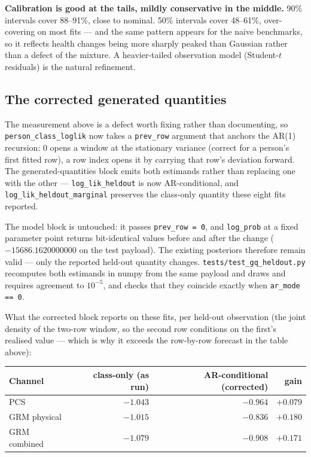 \documentclass[11pt]{article}
\newcommand{\code}[1]{\texttt{\small #1}}
\begin{document}
\textbf{Calibration is good at the tails, mildly conservative in the
middle.} 90\% intervals cover 88--91\%, close to nominal. 50\% intervals
cover 48--61\%, over-covering on most fits --- and the same pattern appears
for the naive benchmarks, so it reflects health changes being more sharply
peaked than Gaussian rather than a defect of the mixture. A heavier-tailed
observation model (Student-$t$ residuals) is the natural refinement.

\subsection*{The corrected generated quantities}
\label{sec:gqfix}

The measurement above is a defect worth fixing rather than documenting, so
\code{person\_class\_loglik} now takes a \code{prev\_row} argument that
anchors the AR(1) recursion: $0$ opens a window at the stationary variance
(correct for a person's first fitted row), a row index opens it by carrying
that row's deviation forward. The generated-quantities block emits both
estimands rather than replacing one with the other ---
\code{log\_lik\_heldout} is now AR-conditional, and
\code{log\_lik\_heldout\_marginal} preserves the class-only quantity these
eight fits reported.

The model block is untouched: it passes \code{prev\_row = 0}, and
\code{log\_prob} at a fixed parameter point returns bit-identical values
before and after the change ($-15686.1620000000$ on the test payload). The
existing posteriors therefore remain valid --- only the reported held-out
quantity changes. \code{tests/test\_gq\_heldout.py} recomputes both
estimands in numpy from the same payload and draws and requires agreement to
$10^{-5}$, and checks that they coincide exactly when \code{ar\_mode == 0}.

What the corrected block reports on these fits, per held-out observation
(the joint density of the two-row window, so the second row conditions on
the first's realised value --- which is why it exceeds the row-by-row
forecast in the table above):

\begin{center}\small
\begin{tabular}{lrrr}
\toprule
Channel & class-only (as run) & AR-conditional (corrected) & gain \\
\midrule
PCS & $-1.043$ & $-0.964$ & $+0.079$ \\
GRM physical & $-1.015$ & $-0.836$ & $+0.180$ \\
GRM combined & $-1.079$ & $-0.908$ & $+0.171$ \\
\bottomrule
\end{tabular}
\end{center}
\end{document}
